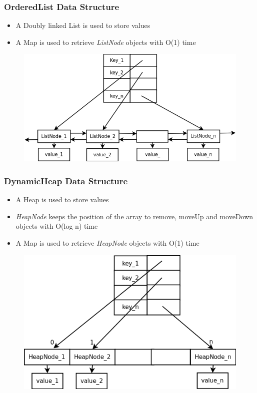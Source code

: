\documentclass[handout]{beamer}
\begin{document}
\begin{frame}
\frametitle{OrderedList Data Structure}

\begin{itemize}
        \item A Doubly linked List is used to store values
        \item A Map is used to retrieve \textit{ListNode} objects with O(1) time
\end{itemize}

\begin{figure}
        \includegraphics[width=0.7\linewidth]{orderedlist.png}
\end{figure}

\end{frame}

\begin{frame}
\frametitle{DynamicHeap Data Structure}

\begin{itemize}
        \item A Heap is used to store values
        \item \textit{HeapNode} keeps the position of the array to remove, moveUp and moveDown objects with O(log n) time
	\item A Map is used to retrieve \textit{HeapNode} objects with O(1) time
\end{itemize}

\begin{figure}
        \includegraphics[width=0.6\linewidth]{DinamicHeap.png}
\end{figure}

\end{frame}
\end{document}
